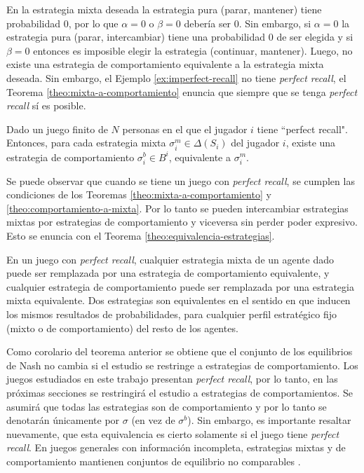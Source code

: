 En la estrategia mixta deseada la estrategia pura (parar, mantener) tiene probabilidad $0$, por lo que $\alpha = 0$ o $\beta = 0$ debería ser $0$. Sin embargo, si $\alpha = 0$ la estrategia pura (parar, intercambiar) tiene una probabilidad $0$ de ser elegida y si $\beta = 0$ entonces es imposible elegir la estrategia (continuar, mantener). Luego, no existe una estrategia de comportamiento equivalente a la estrategia mixta deseada. Sin embargo, el Ejemplo \ref{ex:imperfect-recall} no tiene \textit{perfect recall}, el Teorema \ref{theo:mixta-a-comportamiento} enuncia que siempre que se tenga \textit{perfect recall} sí es posible.

\begin{theorem}
\label{theo:mixta-a-comportamiento}
Dado un juego finito de $N$ personas en el que el jugador $i$ tiene ``perfect recall". Entonces, para cada estrategia mixta $\sigma^m_i \in \Delta(S_i)$ del jugador $i$, existe una estrategia de comportamiento $\sigma^b_i \in B^i$, equivalente a $\sigma^m_i$.
\end{theorem}


Se puede observar que cuando se tiene un juego con \textit{perfect recall}, se cumplen las condiciones de los Teoremas \ref{theo:mixta-a-comportamiento} y \ref{theo:comportamiento-a-mixta}. Por lo tanto se pueden intercambiar estrategias mixtas por estrategias de comportamiento y viceversa sin perder poder expresivo. Esto se enuncia con el Teorema \ref{theo:equivalencia-estrategias}.

\begin{theorem}
\label{theo:equivalencia-estrategias}
En un juego con \textit{perfect recall}, cualquier estrategia mixta de un agente dado puede ser remplazada por una estrategia de comportamiento equivalente, y cualquier estrategia de comportamiento puede ser remplazada por una estrategia mixta equivalente. Dos estrategias son equivalentes en el sentido en que inducen los mismos resultados de probabilidades, para cualquier perfil estratégico fijo (mixto o de comportamiento) del resto de los agentes.
\end{theorem}

Como corolario del teorema anterior se obtiene que el conjunto de los equilibrios de Nash no cambia si el estudio se restringe a estrategias de comportamiento. Los juegos estudiados en este trabajo presentan \textit{perfect recall}, por lo tanto, en las próximas secciones se restringirá el estudio a estrategias de comportamientos. Se asumirá que todas las estrategias son de comportamiento y por lo tanto se denotarán únicamente por $\sigma$ (en vez de $\sigma^b$). Sin embargo, es importante resaltar nuevamente, que esta equivalencia es cierto solamente si el juego tiene \textit{perfect recall}. En juegos generales con información incompleta, estrategias mixtas y de comportamiento mantienen conjuntos de equilibrio no comparables \cite[p.~45]{bib:handbook-blai}.
